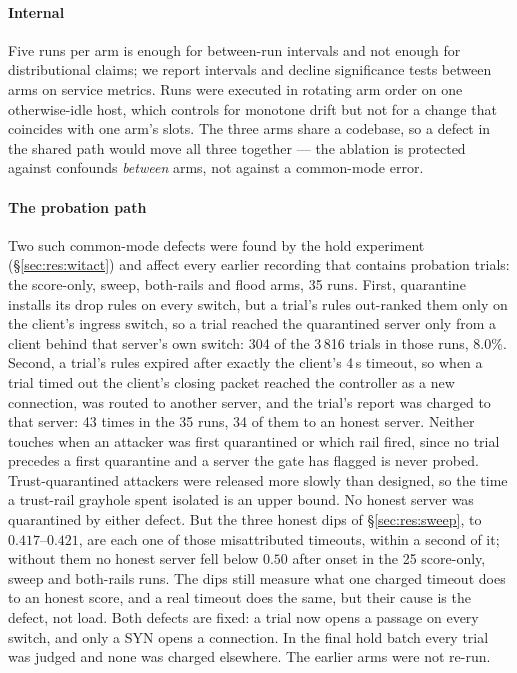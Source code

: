 \documentclass[10pt,twocolumn,letterpaper]{article}
\begin{document}
\paragraph*{Internal}
Five runs per arm is enough for between-run intervals and not enough for
distributional claims; we report intervals and decline significance tests
between arms on service metrics. Runs were executed in rotating arm order on
one otherwise-idle host, which controls for monotone drift but not for a
change that coincides with one arm's slots. The three arms share a codebase,
so a defect in the shared path would move all three together --- the ablation
is protected against confounds \emph{between} arms, not against a common-mode
error.

\paragraph*{The probation path}
Two such common-mode defects were found by the hold experiment
(\S\ref{sec:res:witact}) and affect every earlier recording that contains
probation trials: the score-only, sweep, both-rails and flood arms, 35 runs.
First, quarantine installs its drop rules on every switch, but a trial's rules
out-ranked them only on the client's ingress switch, so a trial reached the
quarantined server only from a client behind that server's own switch: 304 of
the 3\,816 trials in those runs, 8.0\%. Second, a trial's rules expired after
exactly the client's 4\,s timeout, so when a trial timed out the client's
closing packet reached the controller as a new connection, was routed to
another server, and the trial's report was charged to that server: 43 times in
the 35 runs, 34 of them to an honest server. Neither touches when an attacker
was first quarantined or which rail fired, since no trial precedes a first
quarantine and a server the gate has flagged is never probed. Trust-quarantined
attackers were released more slowly than designed, so the time a trust-rail
grayhole spent isolated is an upper bound. No honest server was quarantined by
either defect. But the three honest dips of \S\ref{sec:res:sweep}, to
$0.417$--$0.421$, are each one of those misattributed timeouts, within a second
of it; without them no honest server fell below $0.50$ after onset in the 25
score-only, sweep and both-rails runs. The dips still measure what one charged
timeout does to an honest score, and a real timeout does the same, but their
cause is the defect, not load. Both defects are fixed: a trial now opens a
passage on every switch, and only a SYN opens a connection. In the final hold
batch every trial was judged and none was charged elsewhere. The earlier arms
were not re-run.
\end{document}
